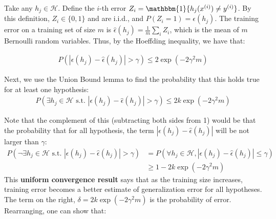 \documentclass[letterpaper,10pt]{article}
\begin{document}
Take any $h_j \in \mathscr{H}$. Define the $i$-th error $Z_i = \mathbbm{1} \{h_j (x^{(i)}) \neq y^{(i)}\}$. By this definition, $Z_i \in \{0, 1\}$ and are i.i.d., and $P(Z_i = 1) = \epsilon(h_j)$.
The training error on a training set of size $m$ is $\hat \epsilon(h_j) = \frac{1}{m} \sum_i Z_i$, which is the mean of $m$ Bernoulli random variables. Thus, by the Hoeffding inequality, we have that:

\begin{align}
P(|\epsilon(h_j) - \hat \epsilon(h_j) | > \gamma) \leq 2 \exp (-2\gamma^2 m)
\end{align}

Next, we use the Union Bound lemma to find the probability that this holds true for at least one hypothesis:
\begin{align}
P(\exists h_j \in \mathscr{H}\text{ s.t. } |\epsilon(h_j) - \hat \epsilon(h_j) | > \gamma) \leq 2k \exp (-2\gamma^2 m)
\end{align}

Note that the complement of this (subtracting both sides from 1) would be that the probability that for all hypothesis, the term $|\epsilon(h_j) - \hat \epsilon(h_j) |$ will be not larger than $\gamma$:
\begin{align}
P(\neg \exists h_j \in \mathscr{H}\text{ s.t. } |\epsilon(h_j) - \hat \epsilon(h_j) | > \gamma) &= P(\forall h_j \in \mathscr{H}, |\epsilon(h_j) - \hat \epsilon(h_j) | \leq \gamma)\\
&\geq 1- 2k \exp (-2\gamma^2 m)
\end{align}
This \textbf{uniform convergence result} says that as the training size increases, training error becomes a better estimate of generalization error for all hypotheses. The term on the right, $\delta = 2k\exp (-2\gamma^2 m)$ is the probability of error. Rearranging, one can show that:
\end{document}
